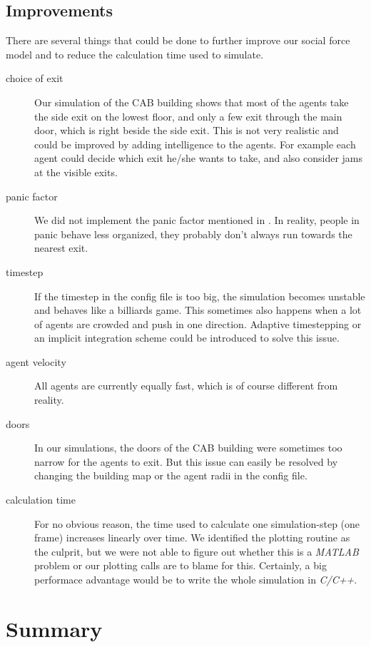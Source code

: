 \documentclass[11pt]{article}
\begin{document}
\subsection{Improvements} \label{subsection:Improvements}
There are several things that could be done to further improve our social force
model and to reduce the calculation time used to simulate.

\begin{description}
	\item[choice of exit] Our simulation of the CAB building shows that most of
		the agents take the side exit on the lowest floor, and only a few exit
		through the main door, which is right beside the side exit. This is not
		very realistic and could be improved by adding intelligence to the
		agents. For example each agent could decide which exit he/she wants to
		take, and also consider jams at the visible exits.
	\item[panic factor] We did not implement the panic factor mentioned in
		\cite{SDFEP}. In reality, people in panic behave less organized, they
		probably don't always run towards the nearest exit.
	\item[timestep] If the timestep in the config file is too big, the
		simulation becomes unstable and behaves like a billiards game. This
		sometimes also happens when a lot of agents are crowded and push in one
		direction. Adaptive timestepping or an implicit integration scheme
		could be introduced to solve this issue.
	\item[agent velocity] All agents are currently equally fast, which is of
		course different from reality.
	\item[doors] In our simulations, the doors of the CAB building were
		sometimes too narrow for the agents to exit. But this issue can easily
		be resolved by changing the building map or the agent radii in the
		config file.
	\item[calculation time] For no obvious reason, the time used to calculate
		one simulation-step (one frame) increases linearly over time. We
		identified the plotting routine as the culprit, but we were not able
		to figure out whether this is a \textit{MATLAB} problem or our plotting
		calls are to blame for this. Certainly, a big performace advantage would
		be to write the whole simulation in \textit{C/C++}. 
\end{description}

\section{Summary}
\end{document}
